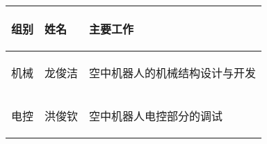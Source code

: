 
\begin{longtable}{ p{2cm} | p{3.5cm} | p{9.3cm} |}

    \hline

    \endfoot
    
    \rowcolor{tabhdcolor}

        \begin{center}
            组别
        \end{center} &
        \begin{center}
            姓名
        \end{center} &
        \begin{center}
            主要工作
        \end{center} \\

    \hline

    \endhead

        \begin{center}
            机械
        \end{center} &
        \begin{center}
            龙俊洁
        \end{center} &
        \begin{center}
            空中机器人的机械结构设计与开发
        \end{center}  \\
        
    \hline
        \begin{center}
            电控
        \end{center}&
        \begin{center}
            洪俊钦
        \end{center}&
        \begin{center}
            空中机器人电控部分的调试
        \end{center}\\


\end{longtable}
